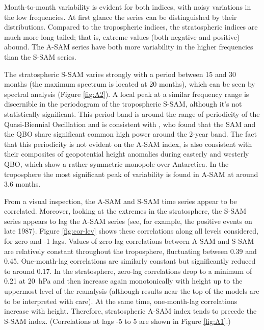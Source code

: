 \documentclass[smallextended]{svjour3}       %
\begin{document}
Month-to-month variability is evident for both indices, with noisy variations in the low frequencies.
At first glance the series can be distinguished by their distributions.
Compared to the tropospheric indices, the stratospheric indices are much more long-tailed; that is, extreme values (both negative and positive) abound.
The A\nobreakdash-SAM series have both more variability in the higher frequencies than the S\nobreakdash-SAM series.

The stratospheric S\nobreakdash-SAM varies strongly with a period between 15 and 30 months (the maximum spectrum is located at 20 months), which can be seen by spectral analysis (Figure \ref{fig:A2}). A local peak at a similar frequency range is discernible in the periodogram of the tropospheric S\nobreakdash-SAM, although it's not statistically significant. This period band is around the range of periodicity of the Quasi-Biennial Oscillation \citep{baldwin2001b} and is consistent with \citep{vasconcellos2020}, who found that the SAM and the QBO share significant common high power around the 2-year band.
The fact that this periodicity is not evident on the A\nobreakdash-SAM index, is also consistent with their composites of geopotential height anomalies during easterly and westerly QBO, which show a rather symmetric monopole over Antarctica.
In the troposphere the most significant peak of variability is found in A\nobreakdash-SAM at around 3.6 months.

From a visual inspection, the A\nobreakdash-SAM and S\nobreakdash-SAM time series appear to be correlated.
Moreover, looking at the extremes in the stratosphere, the S\nobreakdash-SAM series appears to lag the A\nobreakdash-SAM series (see, for example, the positive events on late 1987).
Figure \ref{fig:cor-lev} shows these correlations along all levels considered, for zero and -1 lags.
Values of zero-lag correlations between A\nobreakdash-SAM and S\nobreakdash-SAM are relatively constant throughout the troposphere, fluctuating between 0.39 and 0.45.
One-month-lag correlations are similarly constant but significantly reduced to around 0.17.
In the stratosphere, zero-lag correlations drop to a minimum of 0.21 at 20~hPa and then increase again monotonically with height up to the uppermost level of the reanalysis (although results near the top of the models are to be interpreted with care).
At the same time, one-month-lag correlations increase with height.
Therefore, stratospheric A\nobreakdash-SAM index tends to precede the S\nobreakdash-SAM index.
(Correlations at lags -5 to 5 are shown in Figure \ref{fig:A1}.)
\end{document}
